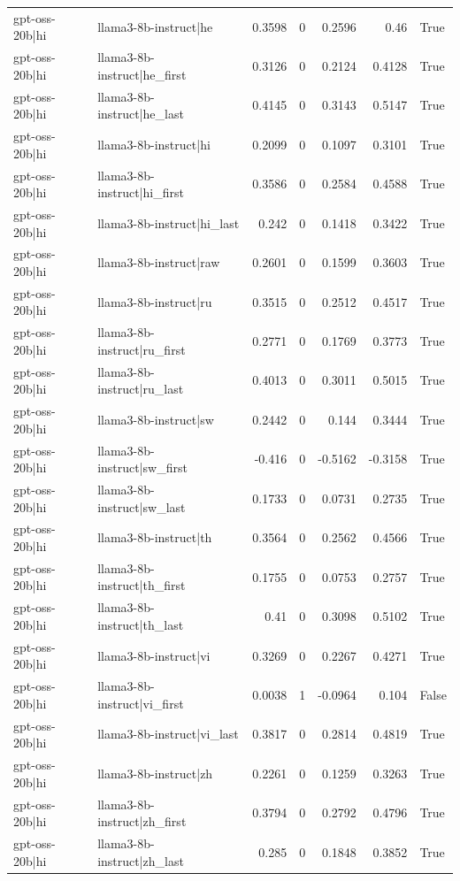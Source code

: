 \begin{table}
\begin{tabular}{l l r r r r l}
gpt-oss-20b|hi & llama3-8b-instruct|he & 0.3598 & 0 & 0.2596 & 0.46 & True \\
gpt-oss-20b|hi & llama3-8b-instruct|he_first & 0.3126 & 0 & 0.2124 & 0.4128 & True \\
gpt-oss-20b|hi & llama3-8b-instruct|he_last & 0.4145 & 0 & 0.3143 & 0.5147 & True \\
gpt-oss-20b|hi & llama3-8b-instruct|hi & 0.2099 & 0 & 0.1097 & 0.3101 & True \\
gpt-oss-20b|hi & llama3-8b-instruct|hi_first & 0.3586 & 0 & 0.2584 & 0.4588 & True \\
gpt-oss-20b|hi & llama3-8b-instruct|hi_last & 0.242 & 0 & 0.1418 & 0.3422 & True \\
gpt-oss-20b|hi & llama3-8b-instruct|raw & 0.2601 & 0 & 0.1599 & 0.3603 & True \\
gpt-oss-20b|hi & llama3-8b-instruct|ru & 0.3515 & 0 & 0.2512 & 0.4517 & True \\
gpt-oss-20b|hi & llama3-8b-instruct|ru_first & 0.2771 & 0 & 0.1769 & 0.3773 & True \\
gpt-oss-20b|hi & llama3-8b-instruct|ru_last & 0.4013 & 0 & 0.3011 & 0.5015 & True \\
gpt-oss-20b|hi & llama3-8b-instruct|sw & 0.2442 & 0 & 0.144 & 0.3444 & True \\
gpt-oss-20b|hi & llama3-8b-instruct|sw_first & -0.416 & 0 & -0.5162 & -0.3158 & True \\
gpt-oss-20b|hi & llama3-8b-instruct|sw_last & 0.1733 & 0 & 0.0731 & 0.2735 & True \\
gpt-oss-20b|hi & llama3-8b-instruct|th & 0.3564 & 0 & 0.2562 & 0.4566 & True \\
gpt-oss-20b|hi & llama3-8b-instruct|th_first & 0.1755 & 0 & 0.0753 & 0.2757 & True \\
gpt-oss-20b|hi & llama3-8b-instruct|th_last & 0.41 & 0 & 0.3098 & 0.5102 & True \\
gpt-oss-20b|hi & llama3-8b-instruct|vi & 0.3269 & 0 & 0.2267 & 0.4271 & True \\
gpt-oss-20b|hi & llama3-8b-instruct|vi_first & 0.0038 & 1 & -0.0964 & 0.104 & False \\
gpt-oss-20b|hi & llama3-8b-instruct|vi_last & 0.3817 & 0 & 0.2814 & 0.4819 & True \\
gpt-oss-20b|hi & llama3-8b-instruct|zh & 0.2261 & 0 & 0.1259 & 0.3263 & True \\
gpt-oss-20b|hi & llama3-8b-instruct|zh_first & 0.3794 & 0 & 0.2792 & 0.4796 & True \\
gpt-oss-20b|hi & llama3-8b-instruct|zh_last & 0.285 & 0 & 0.1848 & 0.3852 & True \\

\end{tabular}
\end{table}
